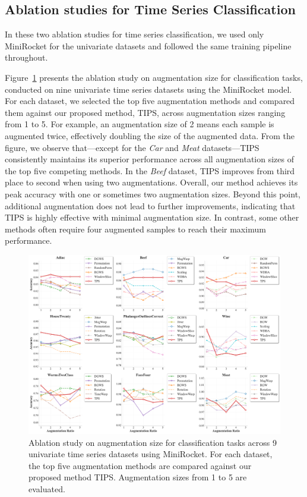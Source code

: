 \subsection{Ablation studies for Time Series Classification}  \label{subsec:ablation-tsc}

In these two ablation studies for time series classification, we used only MiniRocket for the univariate datasets and followed the same training pipeline throughout.

Figure~\ref{fig:augratiotsc} presents the ablation study on augmentation size for classification tasks, conducted on nine univariate time series datasets using the MiniRocket model. For each dataset, we selected the top five augmentation methods and compared them against our proposed method, TIPS, across augmentation sizes ranging from 1 to 5. For example, an augmentation size of 2 means each sample is augmented twice, effectively doubling the size of the augmented data.
From the figure, we observe that—except for the \textit{Car} and \textit{Meat} datasets—TIPS consistently maintains its superior performance across all augmentation sizes of the top five competing methods. In the \textit{Beef} dataset, TIPS improves from third place to second when using two augmentations. Overall, our method achieves its peak accuracy with one or sometimes two augmentation sizes. Beyond this point, additional augmentation does not lead to further improvements, indicating that TIPS is highly effective with minimal augmentation size. In contrast, some other methods often require four augmented samples to reach their maximum performance.


\begin{figure}[h!]
    \centering
\includegraphics[page=1, width=1.0\textwidth, keepaspectratio]{./images/improved_tsc_results.pdf}
\caption{Ablation study on augmentation size for classification tasks across 9 univariate time series datasets using MiniRocket. For each dataset, the top five augmentation methods are compared against our proposed method TIPS. Augmentation sizes from 1 to 5 are evaluated.}
    \label{fig:augratiotsc}
\end{figure}




